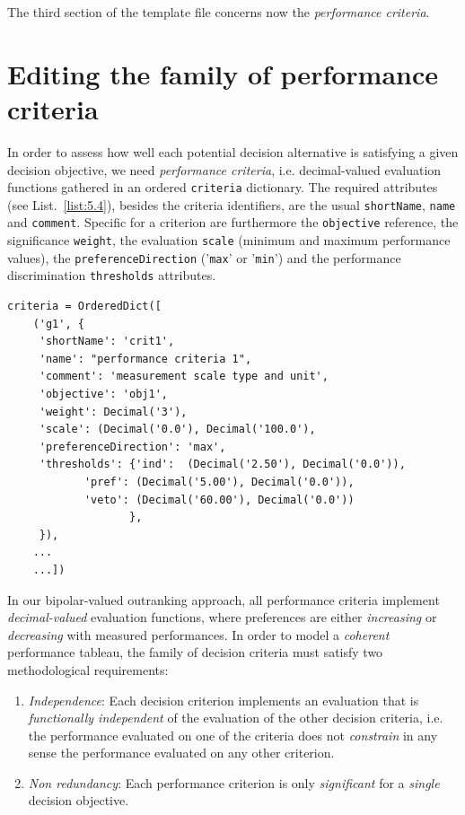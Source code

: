 The third section of the template file concerns now the \emph{performance criteria}.

\section{Editing the family of performance criteria}
\label{sec:5.4}

In order to assess how well each potential decision alternative is satisfying a given decision objective, we need \emph{performance criteria}, i.e. decimal-valued evaluation functions gathered in an ordered \texttt{criteria} dictionary. The required attributes (see List.~\vref{list:5.4}), besides the criteria identifiers, are the usual \texttt{shortName}, \texttt{name} and \texttt{comment}. Specific for a criterion are furthermore the \texttt{objective} reference, the significance \texttt{weight}, the evaluation \texttt{scale} (minimum and  maximum performance values), the \texttt{preferenceDirection} ('\texttt{max}' or '\texttt{min}') and the performance discrimination \texttt{thresholds} attributes.
\begin{lstlisting}[caption={Example of performance criteria description},label=list:5.4]
   criteria = OrderedDict([
    ('g1', {
     'shortName': 'crit1',
     'name': "performance criteria 1",
     'comment': 'measurement scale type and unit',
     'objective': 'obj1',
     'weight': Decimal('3'),
     'scale': (Decimal('0.0'), Decimal('100.0'),
     'preferenceDirection': 'max',
     'thresholds': {'ind':  (Decimal('2.50'), Decimal('0.0')),
		    'pref': (Decimal('5.00'), Decimal('0.0')),
		    'veto': (Decimal('60.00'), Decimal('0.0'))
                   },
     }),
    ...
    ...])
\end{lstlisting}

In our bipolar-valued outranking approach, all performance criteria implement \emph{decimal-valued} evaluation functions, where preferences are either \emph{increasing} or \emph{decreasing} with measured performances. In order to model a \emph{coherent} performance tableau, the family of decision criteria must satisfy two methodological requirements:
\begin{enumerate}[leftmargin=1cm,topsep=1pt]
  \item \emph{Independence}: Each decision criterion implements an evaluation that is \emph{functionally independent} of the evaluation of the other decision criteria, i.e. the performance evaluated on one of the criteria does not \emph{constrain} in any sense the performance evaluated on any other criterion.
  \item \emph{Non redundancy}: Each performance criterion is only \emph{significant} for a \emph{single} decision objective.
\end{enumerate}

